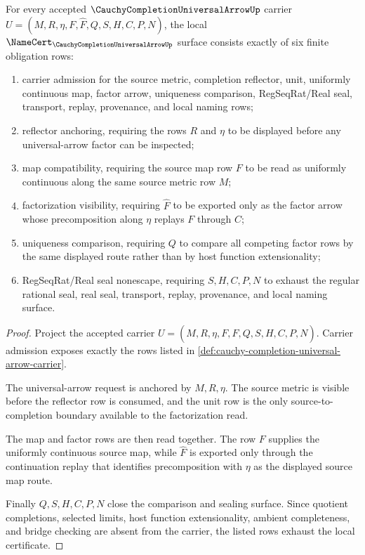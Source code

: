 \begin{theorem}
\label{thm:cauchy-completion-universal-arrow-namecert-obligations}
For every accepted $\CauchyCompletionUniversalArrowUp$ carrier $U=(M,R,\eta,F,\widehat{F},Q,S,H,C,P,N)$, the local $\NameCert_{\CauchyCompletionUniversalArrowUp}$ surface consists exactly of six finite obligation rows:
\begin{enumerate}
\item carrier admission for the source metric, completion reflector, unit, uniformly continuous map, factor arrow, uniqueness comparison, RegSeqRat/Real seal, transport, replay, provenance, and local naming rows;
\item reflector anchoring, requiring the rows $R$ and $\eta$ to be displayed before any universal-arrow factor can be inspected;
\item map compatibility, requiring the source map row $F$ to be read as uniformly continuous along the same source metric row $M$;
\item factorization visibility, requiring $\widehat{F}$ to be exported only as the factor arrow whose precomposition along $\eta$ replays $F$ through $C$;
\item uniqueness comparison, requiring $Q$ to compare all competing factor rows by the same displayed route rather than by host function extensionality;
\item RegSeqRat/Real seal nonescape, requiring $S,H,C,P,N$ to exhaust the regular rational seal, real seal, transport, replay, provenance, and local naming surface.
\end{enumerate}
\end{theorem}
\begin{proof}
Project the accepted carrier $U=(M,R,\eta,F,\widehat{F},Q,S,H,C,P,N)$. Carrier admission exposes exactly the rows listed in \autoref{def:cauchy-completion-universal-arrow-carrier}.

The universal-arrow request is anchored by $M,R,\eta$. The source metric is visible before the reflector row is consumed, and the unit row is the only source-to-completion boundary available to the factorization read.

The map and factor rows are then read together. The row $F$ supplies the uniformly continuous source map, while $\widehat{F}$ is exported only through the continuation replay that identifies precomposition with $\eta$ as the displayed source map route.

Finally $Q,S,H,C,P,N$ close the comparison and sealing surface. Since quotient completions, selected limits, host function extensionality, ambient completeness, and bridge checking are absent from the carrier, the listed rows exhaust the local certificate.
\end{proof}


